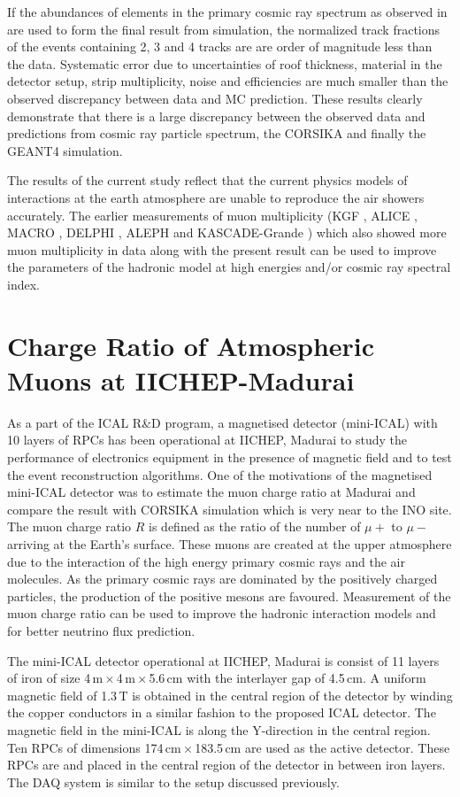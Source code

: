 \documentclass[a4paper,12pt,twoside,openany]{article}
\begin{document}
If the abundances of elements in the primary cosmic ray spectrum as
observed in \cite{cosmic1} are used to form the final
result from simulation, the normalized track fractions of the events
containing 2, 3 and 4 tracks are are order of magnitude less than the
data. Systematic error due to uncertainties of roof thickness,
material in the detector setup, strip multiplicity, noise and
efficiencies are much smaller than the observed discrepancy between
data and MC prediction. These results clearly demonstrate that there
is a large discrepancy between the observed data and predictions from
cosmic ray particle spectrum, the CORSIKA and finally the GEANT4
simulation.

The results of the current study reflect that the current physics models of interactions at the earth atmosphere are unable to reproduce the air showers accurately. The earlier measurements of muon multiplicity (KGF \cite{kgf1}, ALICE \cite{alice1}, MACRO \cite{macro1}, DELPHI \cite{delphi1}, ALEPH \cite{aleph1} and KASCADE-Grande \cite{kascade1}) which also showed more muon multiplicity in data along with the present result can be used to improve the parameters of the hadronic model at high energies and/or cosmic ray spectral index.

\section{Charge Ratio of Atmospheric Muons at IICHEP-Madurai}

As a part of the ICAL R\&D program, a magnetised detector (mini-ICAL) with 10 layers of RPCs has been operational at IICHEP, Madurai to study the performance of electronics equipment in the presence of magnetic field and to test the event reconstruction algorithms. One of the motivations of the magnetised mini-ICAL detector was to estimate the muon charge ratio at Madurai and compare the result with CORSIKA simulation which is very near to the INO site. The muon charge ratio $R$ is defined as the ratio of the number of $\mu+$ to $\mu-$ arriving at the Earth's surface. These muons are created at the upper atmosphere due to the interaction of the high energy primary cosmic rays and the air molecules. As the primary cosmic rays are dominated by the positively charged particles, the production of the positive mesons are favoured. Measurement of the muon charge ratio can be used to improve the hadronic interaction models and for better neutrino flux prediction.

The mini-ICAL detector operational at IICHEP, Madurai is consist of 11 layers of iron of size 4\,m\,$\times$\,4\,m\,$\times$\,5.6\,cm with the interlayer gap of 4.5\,cm. A uniform magnetic field of 1.3\,T is obtained in the central region of the detector by winding the copper conductors in a similar fashion to the proposed ICAL detector. The magnetic field in the mini-ICAL is along the Y-direction in the central region. Ten RPCs of dimensions 174\,cm\,$\times$\,183.5\,cm are used as the active detector. These RPCs are and placed in the central region of the detector in between iron layers. The DAQ system is similar to the setup discussed previously.
\end{document}
